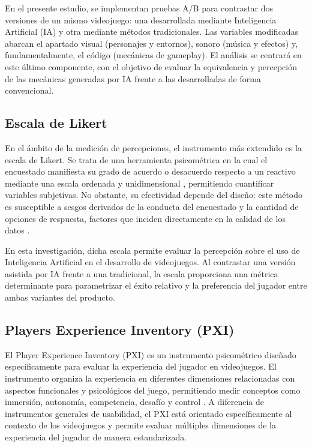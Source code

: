 En el presente estudio, se implementan pruebas A/B para contrastar dos versiones de un mismo videojuego: una desarrollada mediante Inteligencia Artificial (IA) y otra mediante métodos tradicionales. Las variables modificadas abarcan el apartado visual (personajes y entornos), sonoro (música y efectos) y, fundamentalmente, el código (mecánicas de gameplay). El análisis se centrará en este último componente, con el objetivo de evaluar la equivalencia y percepción de las mecánicas generadas por IA frente a las desarrolladas de forma convencional.

\subsection{Escala de Likert}

En el ámbito de la medición de percepciones, el instrumento más extendido es la escala de Likert. Se trata de una herramienta psicométrica en la cual el encuestado manifiesta su grado de acuerdo o desacuerdo respecto a un reactivo mediante una escala ordenada y unidimensional \cite{matas2018likert}, permitiendo cuantificar variables subjetivas. No obstante, su efectividad depende del diseño: este método es susceptible a sesgos derivados de la conducta del encuestado y la cantidad de opciones de respuesta, factores que inciden directamente en la calidad de los datos \cite{matas2018likert}.

En esta investigación, dicha escala permite evaluar la percepción sobre el uso de Inteligencia Artificial en el desarrollo de videojuegos. Al contrastar una versión asistida por IA frente a una tradicional, la escala proporciona una métrica determinante para parametrizar el éxito relativo y la preferencia del jugador entre ambas variantes del producto.

\subsection{Players Experience Inventory (PXI)}

El Player Experience Inventory (PXI) es un instrumento psicométrico diseñado específicamente para evaluar la experiencia del jugador en videojuegos. El instrumento organiza la experiencia en diferentes dimensiones relacionadas con aspectos funcionales y psicológicos del juego, permitiendo medir conceptos como inmersión, autonomía, competencia, desafío y control \cite{vermeeren2019pxi}. A diferencia de instrumentos generales de usabilidad, el PXI está orientado específicamente al contexto de los videojuegos y permite evaluar múltiples dimensiones de la experiencia del jugador de manera estandarizada.

